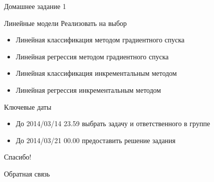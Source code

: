 \documentclass[10pt,a4paper]{beamer}
\begin{document}

\begin{frame}{Домашнее задание 1}

\begin{block}{Линейные модели}
Реализовать на выбор
\begin{itemize}
\item Линейная классификация методом градиентного спуска
\item Линейная регрессия методом градиентного спуска
\item Линейная классификация инкрементальным методом
\item Линейная регрессия инкрементальным методом
\end{itemize}
\end{block}

Ключевые даты
\begin{itemize}
\item До 2014/03/14 23.59 выбрать задачу и ответственного в группе
\item До 2014/03/21 00.00 предоставить решение задания
\end{itemize}

\end{frame}


\begin{frame}{Спасибо!}

\begin{center}
{\Large Обратная связь}
\end{center}

\end{frame}
\end{document}
